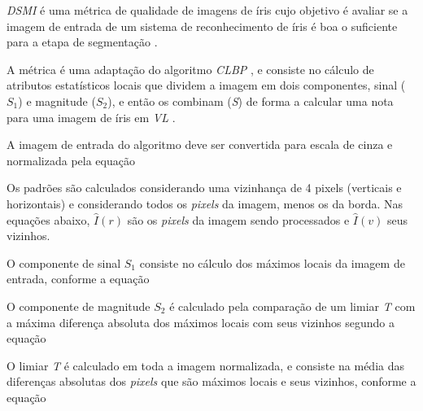 \par \textit{\acrfull{DSMI}} é uma métrica de qualidade de imagens de íris cujo objetivo é avaliar se a imagem de entrada de um sistema de reconhecimento de íris é boa o suficiente para a etapa de segmentação \cite{Jenadeleh_2018_CVPR_Workshops}. 

\par A métrica é uma adaptação do algoritmo \textit{\acrfull{CLBP}} \cite{guo2010-CLBP}, e consiste no cálculo de atributos estatísticos locais que dividem a imagem em dois componentes, sinal ($S_{1}$) e magnitude ($S_{2}$), e então os combinam (\textit{S}) de forma a calcular uma nota para uma imagem de íris em \textit{\acrfull{VL}} \cite{Jenadeleh_2018_CVPR_Workshops}.

\par A imagem de entrada do algoritmo deve ser convertida para escala de cinza e normalizada pela equação


\par Os padrões são calculados considerando uma vizinhança de 4 pixels (verticais e horizontais) e considerando todos os \textit{pixels} da imagem, menos os da borda. Nas equações abaixo, $\widehat{I}(r)$ são os \textit{pixels} da imagem sendo processados e $\widehat{I}(v)$ seus vizinhos.

\par O componente de sinal $S_{1}$ consiste no cálculo dos máximos locais da imagem de entrada, conforme a equação


\par O componente de magnitude $S_{2}$ é calculado pela comparação de um limiar \textit{T} com a máxima diferença absoluta dos máximos locais com seus vizinhos segundo a equação


\noindent O limiar \textit{T} é calculado em toda a imagem normalizada, e consiste na média das diferenças absolutas dos \textit{pixels} que são máximos locais e seus vizinhos, conforme a equação

